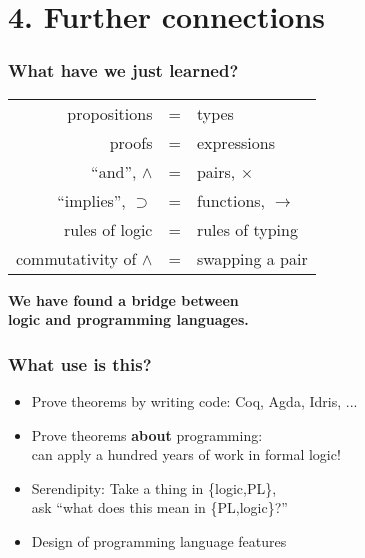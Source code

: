 \documentclass{beamer}
\newcommand{\x}{\times}
\newcommand{\impl}{\supset}
\begin{document}

\section{4. Further connections}

\begin{frame}
  \frametitle{What have we just learned?}
  \begin{center}
    \begin{tabular}{rcl}
      propositions &=& types\\
      proofs &=& expressions\\
      ``and'', $\wedge$ &=& pairs, $\x$\\
      ``implies'', $\impl$ &=& functions, $\to$\\
      rules of logic &=& rules of typing\\
      commutativity of $\wedge$ &=& swapping a pair
    \end{tabular}

    \vspace{1em}
    {\large\bf We have found a bridge between\\ logic and programming languages.}
  \end{center}
\end{frame}

\begin{frame}
  \frametitle{What use is this?}

  \begin{itemize}
  \item Prove theorems by writing code: Coq, Agda, Idris, ...
  \item Prove theorems \textbf{about} programming: \\
    can apply a hundred years of work in formal logic!
  \item Serendipity: Take a thing in \{logic,PL\}, \\ask ``what does this mean in \{PL,logic\}?''
  \item Design of programming language features
  \end{itemize}
\end{frame}
\end{document}

